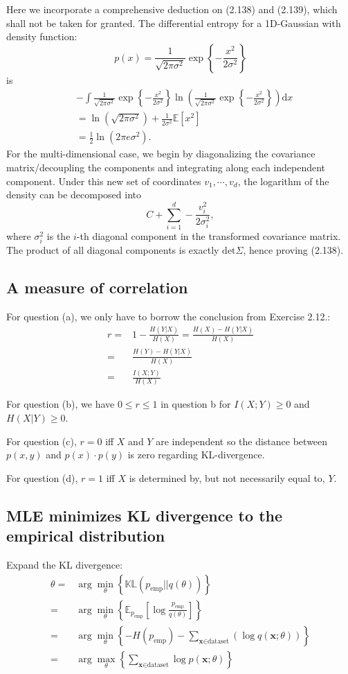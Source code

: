 \documentclass[UTF8]{ctexart}
\begin{document}
Here we incorporate a comprehensive deduction on (2.138) and (2.139), which shall not be taken for granted.
The differential entropy for a 1D-Gaussian with density function:
$$p(x)=\frac{1}{\sqrt{2\pi\sigma^{2}}}\exp\left\{-\frac{x^{2}}{2\sigma^{2}} \right\}$$
is
$$
\begin{aligned}
&-\int\frac{1}{\sqrt{2\pi\sigma^{2}}}\exp\left\{-\frac{x^{2}}{2\sigma^{2}} \right\} \ln\left(\frac{1}{\sqrt{2\pi\sigma^{2}}}\exp\left\{-\frac{x^{2}}{2\sigma^{2}} \right\} \right) \text{d}{x}\\
&=\ln(\sqrt{2\pi\sigma^{2}})+\frac{1}{2\sigma^{2}}\mathbb{E}[x^{2}]\\
&=\frac{1}{2}\ln(2\pi e\sigma^{2}).
\end{aligned}
$$
For the multi-dimensional case, we begin by diagonalizing the covariance matrix/decoupling the components and integrating along each independent component.
Under this new set of coordinates $v_{1},\cdots,v_{d}$, the logarithm of the density can be decomposed into
$$C+\sum_{i=1}^{d}-\frac{v_{i}^{2}}{2\sigma_{i}^{2}},$$
where $\sigma^{2}_{i}$ is the $i$-th diagonal component in the transformed covariance matrix.
The product of all diagonal components is exactly $\text{det}\Sigma$, hence proving (2.138).

\subsection{A measure of correlation}
For question (a), we only have to borrow the conclusion from Exercise 2.12.:
\begin{align}
r=&1-\frac{H(Y|X)}{H(X)}=\frac{H(X)-H(Y|X)}{H(X)} \nonumber \\
=&\frac{H(Y)-H(Y|X)}{H(X)} \nonumber \\
=&\frac{I(X;Y)}{H(X)} \nonumber
\end{align}

For question (b), we have $0 \leq r \leq 1$ in question b for $I(X;Y) \geq 0$ and $H(X|Y) \geq 0$.

For question (c), $r=0$ iff $X$ and $Y$ are independent so the distance between $p(x,y)$ and $p(x)\cdot p(y)$ is zero regarding KL-divergence.

For question (d), $r=1$ iff $X$ is determined by, but not necessarily equal to, $Y$.

\subsection{MLE minimizes KL divergence to the empirical distribution}
Expand the KL divergence:
\begin{align}
\theta=&\arg\min_{\theta}\left\{ \mathbb{KL}(p_{\text{emp}}||q(\theta)) \right\} \nonumber \\
=&\arg\min_{\theta}\left\{ \mathbb{E}_{p_{\text{emp}}}[\log \frac{p_{\text{emp}}}{q(\theta)}] \right\} \nonumber \\
=&\arg\min_{\theta}\left\{ -H(p_{\text{emp}}) - \sum_{\textbf{x}\in \text{dataset}}(\log q(\textbf{x};\theta)) \right\} \nonumber \\
=&\arg\max_{\theta}\left\{ \sum_{\textbf{x}\in \text{dataset}} \log p(\textbf{x};\theta)\right\} \nonumber
\end{align}
\end{document}
